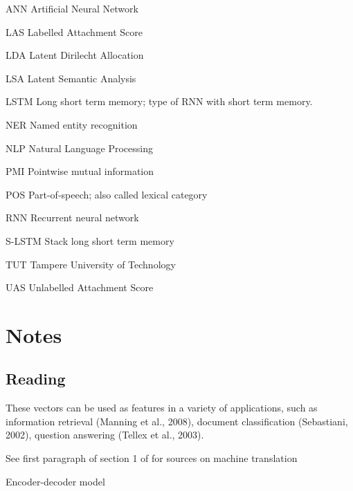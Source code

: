 \documentclass[12pt,a4paper,english
]{tutthesis}
\begin{document}
\begin{termlist}
\item[ANN] Artificial Neural Network
\item[LAS] Labelled Attachment Score
\item[LDA] Latent Dirilecht Allocation
\item[LSA] Latent Semantic Analysis
\item[LSTM] Long short term memory; type of RNN with short term memory.
\item[NER] Named entity recognition
\item[NLP] Natural Language Processing
\item[PMI] Pointwise mutual information
\item[POS] Part-of-speech; also called lexical category
\item[RNN] Recurrent neural network
\item[S-LSTM] Stack long short term memory
\item[TUT] Tampere University of Technology
\item[UAS] Unlabelled Attachment Score
\end{termlist}


\chapter*{Notes}

\section{Reading}
These vectors can be used as features in a variety of applications, such as information retrieval (Manning et al., 2008), document classification (Sebastiani, 2002), question answering (Tellex et al., 2003). \cite{Pennington2014}

See first paragraph of section 1 of \cite{Liang2016a} for sources on machine translation

Encoder-decoder model
\end{document}
